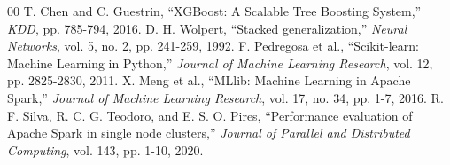 \documentclass[conference]{IEEEtran}
\begin{document}
\begin{thebibliography}{00}
 T. Chen and C. Guestrin, ``XGBoost: A Scalable Tree Boosting System,'' \textit{KDD}, pp. 785-794, 2016.
 D. H. Wolpert, ``Stacked generalization,'' \textit{Neural Networks}, vol. 5, no. 2, pp. 241-259, 1992.
 F. Pedregosa et al., ``Scikit-learn: Machine Learning in Python,'' \textit{Journal of Machine Learning Research}, vol. 12, pp. 2825-2830, 2011.
 X. Meng et al., ``MLlib: Machine Learning in Apache Spark,'' \textit{Journal of Machine Learning Research}, vol. 17, no. 34, pp. 1-7, 2016.
 R. F. Silva, R. C. G. Teodoro, and E. S. O. Pires, ``Performance evaluation of Apache Spark in single node clusters,'' \textit{Journal of Parallel and Distributed Computing}, vol. 143, pp. 1-10, 2020.
\end{thebibliography}
\end{document}
